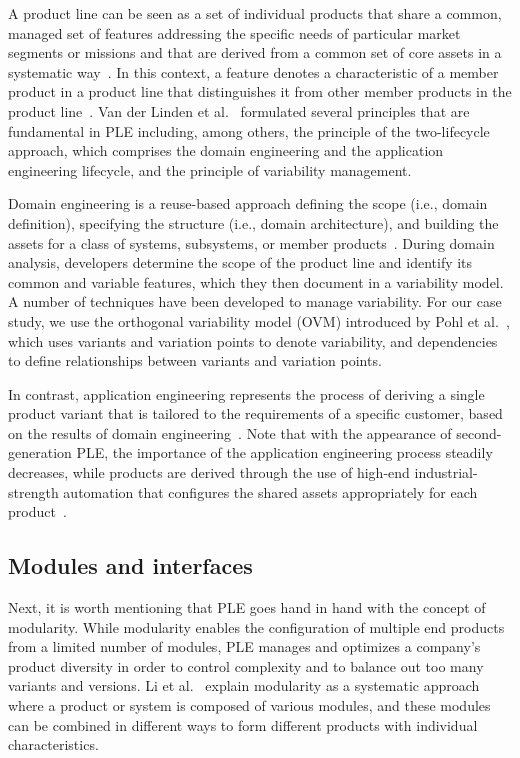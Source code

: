 \documentclass[sigconf,review,anonymous]{acmart}
\begin{document}
A product line can be seen as a set of individual products that share a common, managed set of features addressing the specific needs of particular market segments or missions and that are derived from a common set of core assets in a systematic way~\cite{Clements_2002}.
In this context, a feature denotes a characteristic of a member product in a product line that distinguishes it from other member products in the product line~\cite{ISO/IEC_26550}.
Van der Linden et al.~\cite{Linden_2007} formulated several principles that are fundamental in PLE including, among others, the principle of the two-lifecycle approach, which comprises the domain engineering and the application engineering lifecycle, and the principle of variability management.

Domain engineering is a reuse-based approach defining the scope (i.e., domain definition), specifying the structure (i.e., domain architecture), and building the assets for a class of systems, subsystems, or member products~\cite{ISO/IEC_26550}.
During domain analysis, developers determine the scope of the product line and identify its common and variable features, which they then document in a variability model. 
A number of techniques have been developed to manage variability.
For our case study, we use the orthogonal variability model (OVM) introduced by Pohl et al.~\cite{Pohl_2005}, which uses variants and variation points to denote variability, and dependencies to define relationships between variants and variation points.

In contrast, application engineering represents the process of deriving a single product variant that is tailored to the requirements of a specific customer, based on the results of domain engineering~\cite{Kästner_2013}. 
Note that with the appearance of second-generation PLE, the importance of the application engineering process steadily decreases, while products are derived through the use of high-end industrial-strength automation that configures the shared assets appropriately for each product~\cite{Krueger_2013}.

\subsection{Modules and interfaces}
\label{sec:modules}

Next, it is worth mentioning that PLE goes hand in hand with the concept of modularity.
While modularity enables the configuration of multiple end products from a limited number of modules, PLE manages and optimizes a company's product diversity in order to control complexity and to balance out too many variants and versions.
Li et al.~\cite{Li_2019} explain modularity as a systematic approach where a product or system is composed of various modules, and these modules can be combined in different ways to form different products with individual characteristics.
\end{document}
